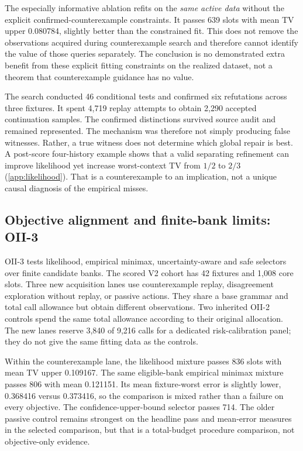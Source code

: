 The especially informative ablation refits on the \emph{same active data} without the explicit confirmed-counterexample constraints. It passes 639 slots with mean TV upper 0.080784, slightly better than the constrained fit. This does not remove the observations acquired during counterexample search and therefore cannot identify the value of those queries separately. The conclusion is no demonstrated extra benefit from these explicit fitting constraints on the realized dataset, not a theorem that counterexample guidance has no value.

The search conducted 46 conditional tests and confirmed six refutations across three fixtures. It spent 4,719 replay attempts to obtain 2,290 accepted continuation samples. The confirmed distinctions survived source audit and remained represented. The mechanism was therefore not simply producing false witnesses. Rather, a true witness does not determine which global repair is best. A post-score four-history example shows that a valid separating refinement can improve likelihood yet increase worst-context TV from $1/2$ to $2/3$ (\cref{app:likelihood}). That is a counterexample to an implication, not a unique causal diagnosis of the empirical misses.

\subsection{Objective alignment and finite-bank limits: OII-3}\label{p3:c06}
OII-3 tests likelihood, empirical minimax, uncertainty-aware and safe selectors over finite candidate banks. The scored V2 cohort has 42 fixtures and 1,008 core slots. Three new acquisition lanes use counterexample replay, disagreement exploration without replay, or passive actions. They share a base grammar and total call allowance but obtain different observations. Two inherited OII-2 controls spend the same total allowance according to their original allocation. The new lanes reserve 3,840 of 9,216 calls for a dedicated risk-calibration panel; they do not give the same fitting data as the controls.

Within the counterexample lane, the likelihood mixture passes 836 slots with mean TV upper 0.109167. The same eligible-bank empirical minimax mixture passes 806 with mean 0.121151. Its mean fixture-worst error is slightly lower, 0.368416 versus 0.373416, so the comparison is mixed rather than a failure on every objective. The confidence-upper-bound selector passes 714. The older passive control remains strongest on the headline pass and mean-error measures in the selected comparison, but that is a total-budget procedure comparison, not objective-only evidence.

